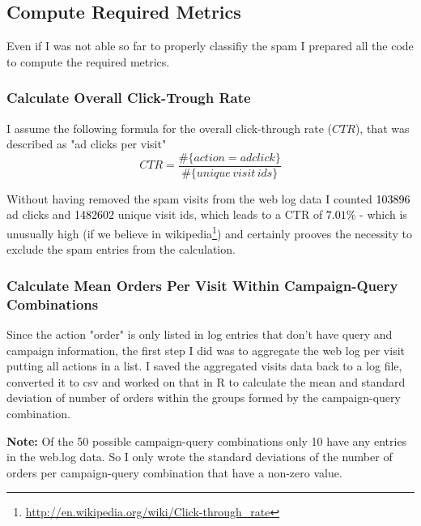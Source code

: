 \documentclass{article}\usepackage[]{graphicx}\usepackage[]{color}
\begin{document}
\subsection{Compute Required Metrics} %
\label{sub:compute_metrics}

Even if I was not able so far to properly classifiy the spam I prepared all the code to compute the required metrics.

\subsubsection{Calculate Overall Click-Trough Rate} %
\label{subsub:calculate_ctr}

I assume the following formula for the overall click-through rate ($CTR$), that was described as "ad clicks per visit"
$$
CTR = \frac{ \#\{action=adclick\} }{ \#\{unique \, visit \, ids\}}
$$

Without having removed the spam visits from the web log data I counted \textcolor{black}{103896} ad clicks and \textcolor{black}{1482602} unique visit ids, which leads to a CTR of \textcolor{black}{$7.01\%$} - which is unusually high (if we believe in wikipedia\footnote{\url{http://en.wikipedia.org/wiki/Click-through_rate}}) and certainly prooves the necessity to exclude the spam entries from the calculation.



\subsubsection{Calculate Mean Orders Per Visit Within Campaign-Query Combinations} %
\label{subsub:calculate_mean_cq}
Since the action "order" is only listed in log entries that don't have query and campaign information, the first step I did was to aggregate the web log per visit 
putting all actions in a list.
I saved the aggregated visits data back to a log file, converted it to csv and worked on that in R to calculate the mean and standard deviation of number of orders within the groups formed by the campaign-query combination.

\textbf{Note:} Of the 50 possible campaign-query combinations only 10 have any entries in the web.log data. So I only wrote the standard deviations of the number of orders per campaign-query combination that have a non-zero value. 
\end{document}
